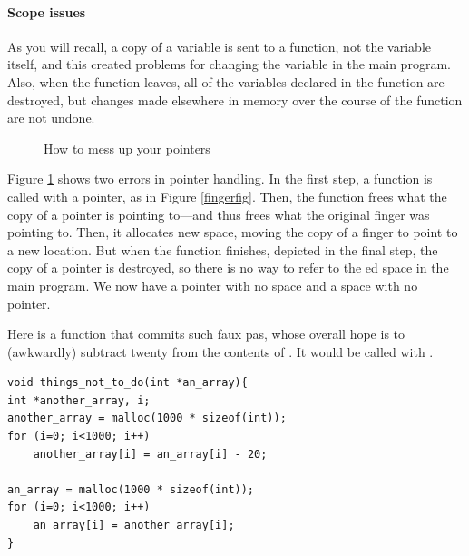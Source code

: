 \documentclass[12pt]{article}
\begin{document}
\paragraph{Scope issues} As you will recall, a copy of a variable is sent to a function, not the variable
itself, and this created problems for changing the variable in the main program. Also, when the function
leaves, all of the variables declared in the function are destroyed,
but changes made elsewhere in memory over the course of the function are
not undone. 

\begin{figure}
\hskip -1cm
\caption{How to mess up your pointers}
\label{fauxpas}
\end{figure}

Figure \ref{fauxpas} shows two errors in pointer handling. In the first
step, a function is called with a pointer, as in Figure
\ref{fingerfig}. Then, the function frees what the copy of a pointer
is pointing to---and thus frees what the original finger was pointing
to. Then, it allocates new space, moving the copy of a finger to point to
a new location. But when the function finishes, depicted in the final
step, the copy of a pointer is destroyed, so there is no way to refer to
the ed space in the main program. We now have a pointer
with no space and a space with no pointer.

Here is a function that commits such faux pas,
whose overall hope is to (awkwardly) subtract twenty from
the contents of . It would be called with
.  
\begin{lstlisting}
void things_not_to_do(int *an_array){
int *another_array, i;
another_array = malloc(1000 * sizeof(int));
for (i=0; i<1000; i++)
    another_array[i] = an_array[i] - 20;

an_array = malloc(1000 * sizeof(int));
for (i=0; i<1000; i++)
    an_array[i] = another_array[i];
}
\end{lstlisting}
\end{document}
